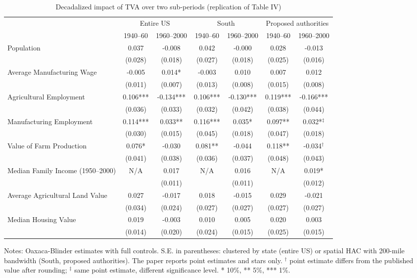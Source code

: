 \begin{table}[htbp]
\centering
\footnotesize
\setlength{\tabcolsep}{4pt}
\caption{Decadalized impact of TVA over two sub-periods (replication of Table IV)}
\label{tab:km_t4}
\begin{tabular}{lcccccc}
\toprule
 & \multicolumn{2}{c}{Entire US} & \multicolumn{2}{c}{South} & \multicolumn{2}{c}{Proposed authorities} \\
\cmidrule(lr){2-3}\cmidrule(lr){4-5}\cmidrule(lr){6-7}
 & 1940--60 & 1960--2000 & 1940--60 & 1960--2000 & 1940--60 & 1960--2000 \\
\midrule
Population & 0.037 & -0.008 & 0.042 & -0.000 & 0.028 & -0.013 \\
 & (0.028) & (0.018) & (0.027) & (0.018) & (0.025) & (0.016) \\
Average Manufacturing Wage & -0.005 & 0.014* & -0.003 & 0.010 & 0.007 & 0.012 \\
 & (0.011) & (0.007) & (0.013) & (0.008) & (0.015) & (0.008) \\
Agricultural Employment & 0.106*** & -0.134*** & 0.106*** & -0.130*** & 0.119*** & -0.166*** \\
 & (0.036) & (0.033) & (0.032) & (0.042) & (0.038) & (0.044) \\
Manufacturing Employment & 0.114*** & 0.033** & 0.116*** & 0.035* & 0.097** & 0.032*$^\ddagger$ \\
 & (0.030) & (0.015) & (0.045) & (0.018) & (0.047) & (0.018) \\
Value of Farm Production & 0.076* & -0.030 & 0.081** & -0.044 & 0.118** & -0.034$^\dagger$ \\
 & (0.041) & (0.038) & (0.036) & (0.037) & (0.048) & (0.043) \\
Median Family Income (1950--2000) & N/A & 0.017 & N/A & 0.016 & N/A & 0.019* \\
 &  & (0.011) &  & (0.011) &  & (0.012) \\
Average Agricultural Land Value & 0.027 & -0.017 & 0.018 & -0.015 & 0.029 & -0.021 \\
 & (0.034) & (0.024) & (0.027) & (0.027) & (0.027) & (0.027) \\
Median Housing Value & 0.019 & -0.003 & 0.010 & 0.005 & 0.020 & 0.003 \\
 & (0.014) & (0.020) & (0.024) & (0.015) & (0.025) & (0.015) \\
\bottomrule
\end{tabular}
\begin{minipage}{0.95\textwidth}\vspace{4pt}\scriptsize Notes: Oaxaca-Blinder estimates with full controls. S.E. in parentheses: clustered by state (entire US) or spatial HAC with 200-mile bandwidth (South, proposed authorities). The paper reports point estimates and stars only. $^\dagger$ point estimate differs from the published value after rounding; $^\ddagger$ same point estimate, different significance level. * 10\%, ** 5\%, *** 1\%.\end{minipage}
\end{table}